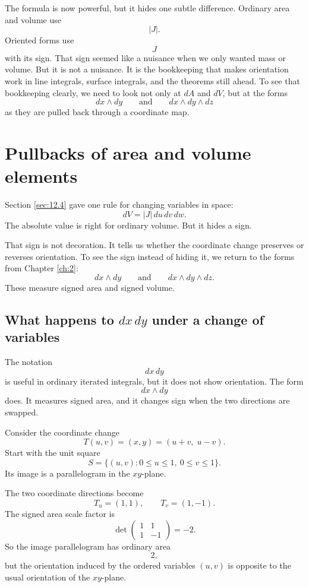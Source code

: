 The formula is now powerful, but it hides one subtle difference.  Ordinary area and
volume use
\[
    |J|.
\]
Oriented forms use
\[
    J
\]
with its sign.  That sign seemed like a nuisance when we only wanted mass or volume.
But it is not a nuisance.  It is the bookkeeping that makes orientation work in line
integrals, surface integrals, and the theorems still ahead.  To see that bookkeeping
clearly, we need to look not only at \(dA\) and \(dV\), but at the forms
\[
    dx\wedge dy
    \qquad\text{and}\qquad
    dx\wedge dy\wedge dz
\]
as they are pulled back through a coordinate map.
\section{Pullbacks of area and volume elements}
\label{sec:12.5}

Section \ref{sec:12.4} gave one rule for changing variables in space:
\[
    dV=|J|\,du\,dv\,dw.
\]
The absolute value is right for ordinary volume.  But it hides a sign.

That sign is not decoration.  It tells us whether the coordinate change preserves or
reverses orientation.  To see the sign instead of hiding it, we return to the forms from
Chapter \ref{ch:2}:
\[
    dx\wedge dy
    \qquad\text{and}\qquad
    dx\wedge dy\wedge dz.
\]
These measure signed area and signed volume.

\subsection{What happens to \texorpdfstring{\(dx\,dy\)}{dx dy} under a change of variables}

The notation
\[
    dx\,dy
\]
is useful in ordinary iterated integrals, but it does not show orientation.  The form
\[
    dx\wedge dy
\]
does.  It measures signed area, and it changes sign when the two directions are swapped.

Consider the coordinate change
\[
    T(u,v)=(x,y)=(u+v,\;u-v).
\]
Start with the unit square
\[
    S=\{(u,v):0\le u\le1,\ 0\le v\le1\}.
\]
Its image is a parallelogram in the \(xy\)-plane.

The two coordinate directions become
\[
    T_u=(1,1),
    \qquad
    T_v=(1,-1).
\]
The signed area scale factor is
\[
    \det
    \begin{pmatrix}
        1&1\\
        1&-1
    \end{pmatrix}
    =
    -2.
\]
So the image parallelogram has ordinary area
\[
    2,
\]
but the orientation induced by the ordered variables \((u,v)\) is opposite to the usual
orientation of the \(xy\)-plane.

